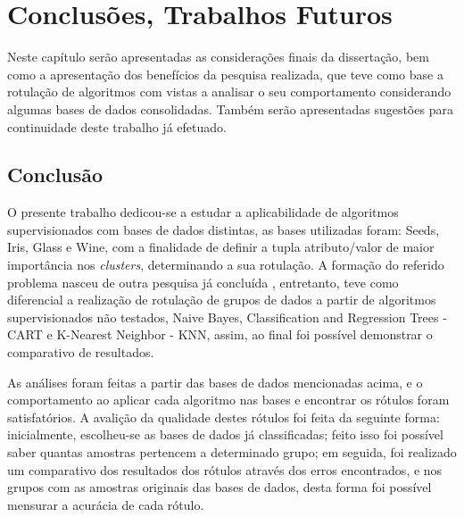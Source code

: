 \chapter{Conclusões, Trabalhos Futuros}\label{cap:conclusao} 

Neste capítulo serão apresentadas as considerações finais da dissertação, bem como a apresentação dos benefícios da pesquisa realizada, que teve como base a rotulação de algoritmos com vistas a analisar o seu comportamento considerando algumas bases de dados consolidadas. Também serão apresentadas sugestões para continuidade deste trabalho já efetuado.

\section{Conclusão}\label{cond}

O presente trabalho dedicou-se a estudar a aplicabilidade de algoritmos supervisionados com bases de dados distintas, as bases utilizadas foram: Seeds, Iris, Glass e Wine, com a finalidade de definir a tupla atributo/valor de maior importância nos \textit{clusters}, determinando a sua rotulação. A formação do referido problema nasceu de outra pesquisa já concluída \cite{Lopes2016}, entretanto, teve como diferencial a realização de rotulação de grupos de dados a partir de algoritmos supervisionados não testados, Naive Bayes, Classification and Regression Trees - CART e K-Nearest Neighbor - KNN, assim, ao final foi possível demonstrar o comparativo de resultados.


As análises foram feitas a partir das bases de dados mencionadas acima, e o comportamento ao aplicar cada algoritmo nas bases e encontrar os rótulos foram satisfatórios. A avalição da qualidade destes rótulos foi feita da seguinte forma: inicialmente, escolheu-se as bases de dados já classificadas; feito isso foi possível saber quantas amostras pertencem a determinado grupo; em seguida, foi realizado um comparativo dos resultados dos rótulos através dos erros encontrados, e nos grupos com as amostras originais das bases de dados, desta forma foi possível mensurar a acurácia de cada rótulo. 



